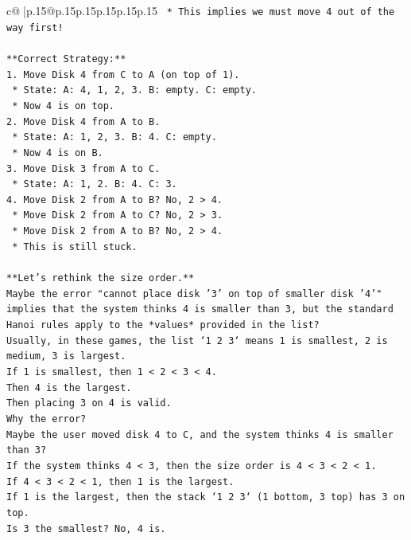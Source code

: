 \documentclass{article}
\begin{document}
{\begin{supertabular}{c@{$\;$}|p{.15\linewidth}@{}p{.15\linewidth}p{.15\linewidth}p{.15\linewidth}p{.15\linewidth}p{.15\linewidth}}
{{{\texttt{    *   This implies we must move 4 out of the way first!} \\
\\ 
\texttt{**Correct Strategy:**} \\
\texttt{1.  Move Disk 4 from C to A (on top of 1).} \\
\texttt{    *   State: A: 4, 1, 2, 3. B: empty. C: empty.} \\
\texttt{    *   Now 4 is on top.} \\
\texttt{2.  Move Disk 4 from A to B.} \\
\texttt{    *   State: A: 1, 2, 3. B: 4. C: empty.} \\
\texttt{    *   Now 4 is on B.} \\
\texttt{3.  Move Disk 3 from A to C.} \\
\texttt{    *   State: A: 1, 2. B: 4. C: 3.} \\
\texttt{4.  Move Disk 2 from A to B? No, 2 > 4.} \\
\texttt{    *   Move Disk 2 from A to C? No, 2 > 3.} \\
\texttt{    *   Move Disk 2 from A to B? No, 2 > 4.} \\
\texttt{    *   This is still stuck.} \\
\\ 
\texttt{**Let's rethink the size order.**} \\
\texttt{Maybe the error "cannot place disk '3' on top of smaller disk '4'" implies that the system thinks 4 is smaller than 3, but the standard Hanoi rules apply to the *values* provided in the list?} \\
\texttt{Usually, in these games, the list `1 2 3` means 1 is smallest, 2 is medium, 3 is largest.} \\
\texttt{If 1 is smallest, then 1 < 2 < 3 < 4.} \\
\texttt{Then 4 is the largest.} \\
\texttt{Then placing 3 on 4 is valid.} \\
\texttt{Why the error?} \\
\texttt{Maybe the user moved disk 4 to C, and the system thinks 4 is smaller than 3?} \\
\texttt{If the system thinks 4 < 3, then the size order is 4 < 3 < 2 < 1.} \\
\texttt{If 4 < 3 < 2 < 1, then 1 is the largest.} \\
\texttt{If 1 is the largest, then the stack `1 2 3` (1 bottom, 3 top) has 3 on top.} \\
\texttt{Is 3 the smallest? No, 4 is.} \\
}}}
\end{supertabular}}
\end{document}
